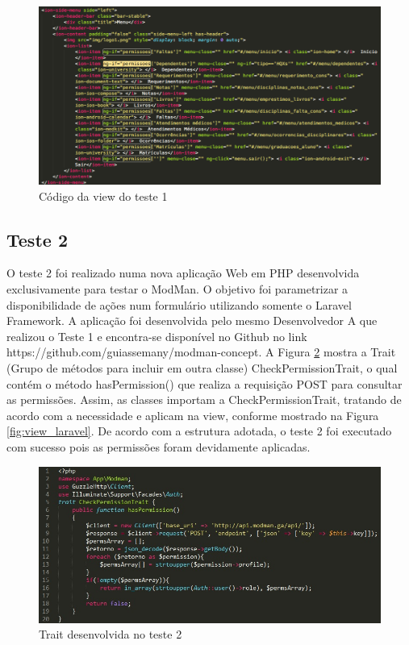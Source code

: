 \begin{figure}
	\includegraphics[width=1\textwidth]{images/edic_a_o_da_view_-_teste_do_app_do_e-grafite}
	\caption{Código da view do teste 1}
    \label{fig:print2}
\end{figure}


\subsection{Teste 2}

O teste 2 foi realizado numa nova aplicação Web em PHP desenvolvida exclusivamente para testar o ModMan. O objetivo foi parametrizar a disponibilidade de ações num formulário utilizando somente o Laravel Framework. A aplicação foi desenvolvida pelo mesmo Desenvolvedor A que realizou o Teste 1 e encontra-se disponível no Github no link https://github.com/guiassemany/modman-concept. A Figura \ref{fig:trait} mostra a Trait (Grupo de métodos para incluir em outra classe) CheckPermissionTrait, o qual contém o método hasPermission() que realiza a requisição POST para consultar as permissões. Assim, as classes importam a CheckPermissionTrait, tratando de acordo com a necessidade e aplicam na view, conforme mostrado na Figura \ref{fig:view_laravel}. De acordo com a estrutura adotada, o teste 2 foi executado com sucesso pois as permissões foram devidamente aplicadas.

\begin{figure}
	\includegraphics[width=1\textwidth]{images/trait.jpg}
	\caption{Trait desenvolvida no teste 2}
    \label{fig:trait}
\end{figure}

